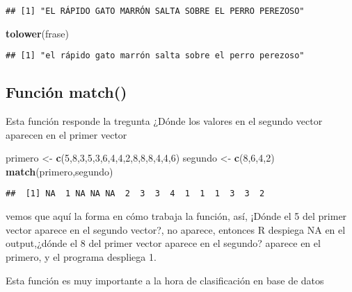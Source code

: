 \documentclass[]{article}
\newenvironment{Shaded}{\begin{snugshade}}{\end{snugshade}}
\newcommand{\KeywordTok}[1]{\textcolor[rgb]{0.13,0.29,0.53}{\textbf{#1}}}
\newcommand{\DecValTok}[1]{\textcolor[rgb]{0.00,0.00,0.81}{#1}}
\newcommand{\StringTok}[1]{\textcolor[rgb]{0.31,0.60,0.02}{#1}}
\newcommand{\NormalTok}[1]{#1}
\begin{document}
\begin{verbatim}
## [1] "EL RÁPIDO GATO MARRÓN SALTA SOBRE EL PERRO PEREZOSO"
\end{verbatim}

\begin{Shaded}
\begin{Highlighting}[]
\KeywordTok{tolower}\NormalTok{(frase)}
\end{Highlighting}
\end{Shaded}

\begin{verbatim}
## [1] "el rápido gato marrón salta sobre el perro perezoso"
\end{verbatim}

\subsection{Función match()}\label{funciuxf3n-match}

Esta función responde la tregunta ¿Dónde los valores en el segundo
vector aparecen en el primer vector

\begin{Shaded}
\begin{Highlighting}[]
\NormalTok{primero <-}\StringTok{ }\KeywordTok{c}\NormalTok{(}\DecValTok{5}\NormalTok{,}\DecValTok{8}\NormalTok{,}\DecValTok{3}\NormalTok{,}\DecValTok{5}\NormalTok{,}\DecValTok{3}\NormalTok{,}\DecValTok{6}\NormalTok{,}\DecValTok{4}\NormalTok{,}\DecValTok{4}\NormalTok{,}\DecValTok{2}\NormalTok{,}\DecValTok{8}\NormalTok{,}\DecValTok{8}\NormalTok{,}\DecValTok{8}\NormalTok{,}\DecValTok{4}\NormalTok{,}\DecValTok{4}\NormalTok{,}\DecValTok{6}\NormalTok{)}
\NormalTok{segundo <-}\StringTok{ }\KeywordTok{c}\NormalTok{(}\DecValTok{8}\NormalTok{,}\DecValTok{6}\NormalTok{,}\DecValTok{4}\NormalTok{,}\DecValTok{2}\NormalTok{)}
\KeywordTok{match}\NormalTok{(primero,segundo)}
\end{Highlighting}
\end{Shaded}

\begin{verbatim}
##  [1] NA  1 NA NA NA  2  3  3  4  1  1  1  3  3  2
\end{verbatim}

vemos que aquí la forma en cómo trabaja la función, así, ¡Dónde el 5 del
primer vector aparece en el segundo vector?, no aparece, entonces R
despiega NA en el output,¿dónde el 8 del primer vector aparece en el
segundo? aparece en el primero, y el programa despliega 1.

Esta función es muy importante a la hora de clasificación en base de
datos
\end{document}
